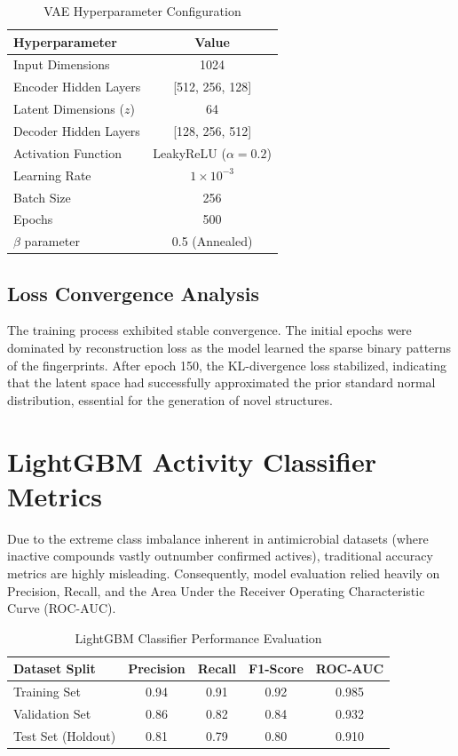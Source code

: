 \begin{table}[htbp]
    \centering
    \caption{VAE Hyperparameter Configuration}
    \begin{tabular}{|l|c|}
        \hline
        \textbf{Hyperparameter} & \textbf{Value} \\
        \hline
        Input Dimensions & 1024 \\
        Encoder Hidden Layers & [512, 256, 128] \\
        Latent Dimensions ($z$) & 64 \\
        Decoder Hidden Layers & [128, 256, 512] \\
        Activation Function & LeakyReLU ($\alpha=0.2$) \\
        Learning Rate & $1 \times 10^{-3}$ \\
        Batch Size & 256 \\
        Epochs & 500 \\
        $\beta$ parameter & 0.5 (Annealed) \\
        \hline
    \end{tabular}
\end{table}

\subsection{Loss Convergence Analysis}
The training process exhibited stable convergence. The initial epochs were dominated by reconstruction loss as the model learned the sparse binary patterns of the fingerprints. After epoch 150, the KL-divergence loss stabilized, indicating that the latent space had successfully approximated the prior standard normal distribution, essential for the generation of novel structures.

\section{LightGBM Activity Classifier Metrics}

Due to the extreme class imbalance inherent in antimicrobial datasets (where inactive compounds vastly outnumber confirmed actives), traditional accuracy metrics are highly misleading. Consequently, model evaluation relied heavily on Precision, Recall, and the Area Under the Receiver Operating Characteristic Curve (ROC-AUC).

\begin{table}[htbp]
    \centering
    \caption{LightGBM Classifier Performance Evaluation}
    \begin{tabular}{|l|c|c|c|c|}
        \hline
        \textbf{Dataset Split} & \textbf{Precision} & \textbf{Recall} & \textbf{F1-Score} & \textbf{ROC-AUC} \\
        \hline
        Training Set & 0.94 & 0.91 & 0.92 & 0.985 \\
        Validation Set & 0.86 & 0.82 & 0.84 & 0.932 \\
        Test Set (Holdout) & 0.81 & 0.79 & 0.80 & 0.910 \\
        \hline
    \end{tabular}
\end{table}

